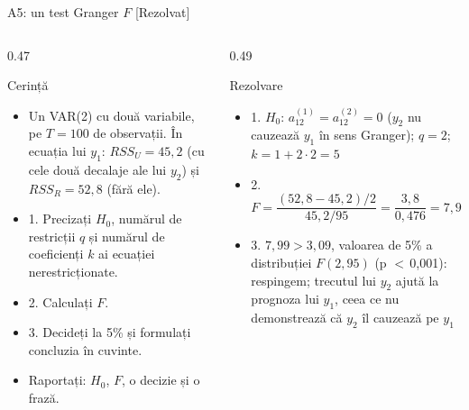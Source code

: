 \begin{frame}{A5: un test Granger $F$ [Rezolvat]}
\itemsize{\scriptsize}
\begin{columns}[T]
\begin{column}{0.47\textwidth}
\begin{block}{Cerință}
\begin{itemize}
    \item Un VAR(2) cu două variabile, pe $T = 100$ de observații. În ecuația lui $y_1$: $RSS_U = 45{,}2$ (cu cele două decalaje ale lui $y_2$) și $RSS_R = 52{,}8$ (fără ele).
    \item 1. Precizați $H_0$, numărul de restricții $q$ și numărul de coeficienți $k$ ai ecuației nerestricționate.
    \item 2. Calculați $F$.
    \item 3. Decideți la 5\% și formulați concluzia în cuvinte.
    \item Raportați: $H_0$, $F$, o decizie și o frază.
\end{itemize}
\end{block}
\end{column}
\begin{column}{0.49\textwidth}
\begin{exampleblock}{Rezolvare}
\begin{itemize}
    \item 1. $H_0$: $a_{12}^{(1)} = a_{12}^{(2)} = 0$ ($y_2$ nu cauzează $y_1$ în sens Granger); $q = 2$; $k = 1 + 2 \cdot 2 = 5$
    \item 2. $F = \dfrac{(52{,}8 - 45{,}2)/2}{45{,}2/95} = \dfrac{3{,}8}{0{,}476} = 7{,}99$
    \item 3. $7{,}99 > 3{,}09$, valoarea de 5\% a distribuției $F(2, 95)$ (p $<$\,0{,}001): respingem; trecutul lui $y_2$ ajută la prognoza lui $y_1$, ceea ce nu demonstrează că $y_2$ îl cauzează pe $y_1$
\end{itemize}
\end{exampleblock}
\end{column}
\end{columns}
\end{frame}


